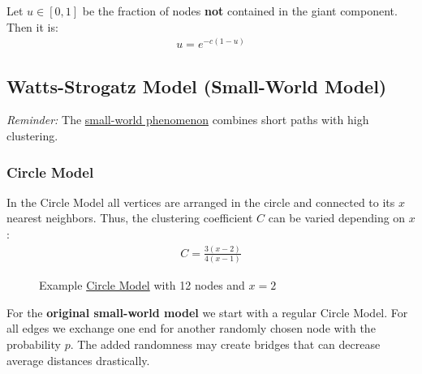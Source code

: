 \documentclass[english]{panikzettel}
\begin{document}
Let $ u \in [0,1] $ be the fraction of nodes \textbf{not} contained in the giant component. Then it is:
\begin{align*}
	u = e^{-c (1-u)}
\end{align*}



\subsection{Watts-Strogatz Model (Small-World Model)}
\textit{Reminder:} The \hyperref[sec:small_world_problem]{small-world phenomenon} combines short paths with high clustering.

\subsubsection{Circle Model}\label{sec:circle_model}
In the Circle Model all vertices are arranged in the circle and connected to its $ x $ nearest neighbors. 
Thus, the clustering coefficient $ C $ can be varied depending on $ x $:
\begin{align*}
	C = \frac{3(x-2)}{4(x-1)}
\end{align*}

\begin{figure}[ht!]
	\centering
	\caption{Example \hyperref[sec:circle_model]{Circle Model} with 12 nodes and $ x = 2 $}
\end{figure}

For the \textbf{original small-world model} we start with a regular Circle Model. 
For all edges we exchange one end for another randomly chosen node with the probability $ p $. 
The added randomness may create bridges that can decrease average distances drastically.
\end{document}
